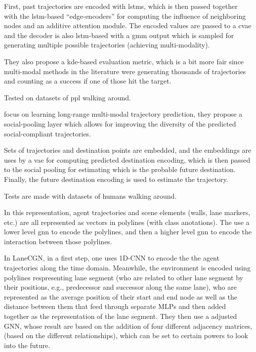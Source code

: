 First, past trajectories are encoded with \glspl{lstm}, which is then passed together with the \gls{lstm}-based ``edge-encoders'' for computing the influence of neighboring nodes and an additive attention module. 
%
The encoded values are passed to a \gls{cvae} and the decoder is also \gls{lstm}-based with a \gls{gmm} output which is sampled for generating multiple possible trajectories (achieving multi-modality).

They also propose a \gls{kde}-based evaluation metric, which is a bit more fair since multi-modal methods in the literature were generating thousands of trajectories and counting as a success if one of those hit the target.

Tested on datasets of ppl walking around.

\cite{mangalam2020not} focus on learning long-range multi-modal trajectory prediction, they propose a social-pooling layer which allows for improving the diversity of the predicted social-compliant trajectories.

Sets of trajectories and destination points are embedded, and the embeddings are uses by a \gls{vae} for computing predicted destination encoding, which is then passed to the social pooling for estimating which is the probable future destination.
%
Finally, the future destination encoding is used to estimate the trajectory.
%

Tests are made with datasets of humans walking around.


\cite{gao2020vectornet} In this representation, agent trajectories and scene elements (walls, lane markers, etc.) are all represented as vectors in polylines (with class anotations). The use a lower level gnn to encode the polylines, and then a higher level gnn to encode the interaction between those polylines. 

 
\cite{liang2020learning} In LaneCGN, in a first step, one uses 1D-CNN to encode the the agent trajectories along the time domain. Meanwhile, the environment is encoded using polylines respresenting lane segment (who are related to other lane segment by their positions, e.g., predecessor and successor along the same lane), who are represented as the average position of their start and end node as well as the distance between them that feed through separate MLPs and then added together as the representation of the lane segment. They then use a adjusted GNN, whose result are based on the addition of four different adjacency matrices, (based on the different relationships), which can be set to certain powers to look into the future.


